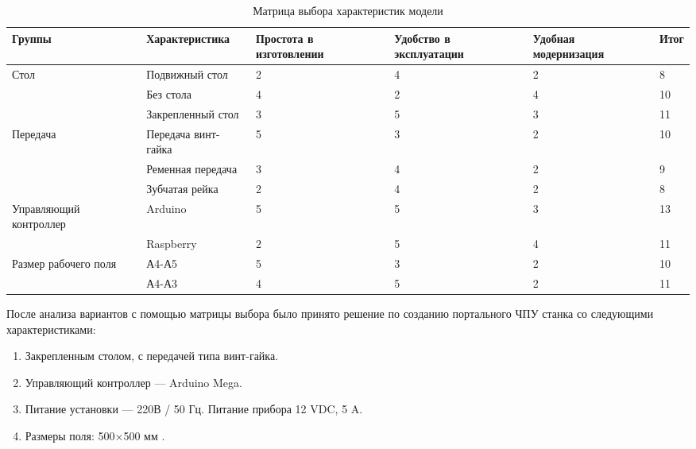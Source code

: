 \documentclass[a4paper,12pt]{article}
\theoremstyle{plain}                          %
\theoremstyle{definition}                     %
\theoremstyle{remark}                         %
\begin{document}
\begin{table}[!ht]
    \centering
    \caption{Матрица выбора характеристик модели}
    \begin{tabular}{|p{3cm}|p{5cm}|p{2cm}|p{2cm}|p{2cm}|p{1cm}|}
        \hline
        Группы                 & Характеристика      & Простота в изготовлении & Удобство в эксплуатации & Удобная модернизация & Итог \\ \hline
        Стол                   & Подвижный стол      & 2                       & 4                       & 2                    & 8    \\ \hline
                               & Без стола           & 4                       & 2                       & 4                    & 10   \\ \hline
                               & Закрепленный стол   & 3                       & 5                       & 3                    & 11   \\ \hline
        Передача               & Передача винт-гайка & 5                       & 3                       & 2                    & 10   \\ \hline
        ~                      & Ременная передача   & 3                       & 4                       & 2                    & 9    \\ \hline
        ~                      & Зубчатая рейка      & 2                       & 4                       & 2                    & 8    \\ \hline
        Управляющий контроллер & Arduino             & 5                       & 5                       & 3                    & 13   \\ \hline
        ~                      & Raspberry           & 2                       & 5                       & 4                    & 11   \\ \hline
        Размер рабочего поля   & А4-А5               & 5                       & 3                       & 2                    & 10   \\ \hline
        ~                      & А4-А3               & 4                       & 5                       & 2                    & 11   \\ \hline
    \end{tabular}
\end{table}

После анализа вариантов с помощью матрицы выбора было принято решение по созданию портального ЧПУ станка со следующими характеристиками:
\begin{enumerate}
    \item Закрепленным столом, с передачей типа винт-гайка.
    \item Управляющий контроллер — Arduino Mega.
    \item Питание установки — 220В / 50 Гц. Питание прибора 12 VDC, 5 A.
    \item Размеры поля: 500×500 мм .
\end{enumerate}
\end{document}
